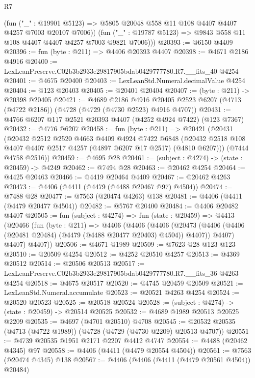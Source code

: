 \begin{lexlean}{R7}
\begin{coremodule}
          (fun ("_" : @19901 @5123) =>
          @5805 @20048 @558 @11 @108 @4407 @4407 @4257 @7003 @20107 @7006))
        (fun ("_" : @19787 @5123) => @9843 @558 @11 @108 @4407 @4407 @4257 @7003 @9821 @7006)))
@20393 := @6150 @4409
@20396 := fun (byte : @211) => @4406 @20393 @4407
@20398 := @4671 @2186 @4916
@20400 := LexLeanPreserve.C02b3b2933e29817905bdab0429777780.R7.__fits_40 @4254
@20401 := @4675 @20400
@20403 := LexLeanStd.Numeral.decimalValue @4254
@20404 := @123 @20403
@20405 := @20401 @20404
@20407 := (byte : @211) -> @20398 @20405
@20421 := @4689
    @2186
    @4916
    @20405
    @2523
    @6207
    (@4713 (@4722 @2186))
    (@4728 (@4729 (@4730 @2523) @4916 @4707))
@20431 := @4766 @6207 @117 @2521 @20393 @4407 (@4252 @4924 @7422) (@123 @7367)
@20432 := @4776 @6207
@20458 := fun (byte : @211) =>
  @20421
    (@20431
      (@20432
        @2512
        @2520
        @4663
        @4409
        @4924
        @7422
        @6848
        (@20432 @2518 @108 @4407 @4407 @2517 @4257 (@4897 @6207 @17 @2517) (@4810 @6207)))
      (@7444 @4758 @2516))
@20459 := @4695 @28
@20461 := (subject : @4274) -> (state : @20459) -> @4249
@20462 := @7494 @28
@20463 := @20462 @4254
@20464 := @4425 @20463
@20466 := @4419 @20464 @4409
@20467 := @20462 @4263
@20473 := @4406 (@4411 (@4479 (@4488 @20467 @97) @4504))
@20474 := @7488 @28
@20477 := @7563 (@20474 @4263) @138
@20481 := @4406 (@4411 (@4479 @20477 @4504))
@20482 := @5767 @20400
@20484 := @4406 @20482 @4407
@20505 := fun (subject : @4274) =>
  fun (state : @20459) =>
  @4413
    (@20466
      (fun (byte : @211) =>
      @4406
        (@4406
          (@4406
            (@20473 (@4406 (@4406 (@20481 @20484) (@4479 (@4488 @20477 @20403) @4504)) @4407))
            @4407)
          @4407)
        @4407))
@20506 := @4671 @1989
@20509 := @7623 @28 @123 @123
@20510 := @20509 @4254
@20512 := @4252 @20510 @4257
@20513 := @4369 @20512
@20514 := @20506 @20513
@20517 := LexLeanPreserve.C02b3b2933e29817905bdab0429777780.R7.__fits_36 @4263 @4254
@20518 := @4675 @20517
@20520 := @4745 @20459 @20509
@20521 := LexLeanStd.Numeral.accumulate
@20523 := @20521 @4263 @4254
@20524 := @20520 @20523
@20525 := @20518 @20524
@20528 := (subject : @4274) -> (state : @20459) -> @20514 @20525
@20532 := @4689 @1989 @20513 @20525 @2209
@20535 := @4697 (@4701 @20510) @4708
@20545 := @20532 @20535 (@4713 (@4722 @1989)) (@4728 (@4729 (@4730 @2209) @20513 @4707))
@20551 := @4739 @20535 @1951 @2171 @2207 @4412 @4747
@20554 := @4488 (@20462 @4345) @97
@20558 := @4406 (@4411 (@4479 @20554 @4504))
@20561 := @7563 (@20474 @4345) @138
@20567 := @4406 (@4406 (@4411 (@4479 @20561 @4504)) @20484)

\end{coremodule}
\end{lexlean}
